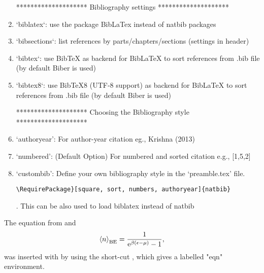 \begin{enumerate}
\begin{center}
******************** Bibliography settings ********************
\end{center}
\item`biblatex`: use the package BibLaTex instead of natbib packages

\item`bibsections`: list references by parts/chapters/sections (settings in header)

\item`bibtex`: use BibTeX as backend for BibLaTeX to sort references from .bib file (by default Biber is used)

\item`bibtex8`: use BibTeX8 (UTF-8 support) as backend for BibLaTeX to sort references from .bib file (by default Biber is used)

\begin{center}
******************** Choosing the Bibliography style ********************
\end{center}
\item`authoryear': For author-year citation eg., Krishna (2013)

\item`numbered': (Default Option) For numbered and sorted citation e.g., [1,5,2]

\item`custombib': Define your own bibliography style in the `preamble.tex' file.
              \begin{verbatim}\RequirePackage}[square, sort, numbers, authoryear]{natbib} \end{verbatim}.
              This can be also used to load biblatex instead of natbib
              
\end{enumerate}



The equation from \autocite{Einstein1924, Einstein1925} and \autocite{deBroglie1929}
\begin{equation}\label{eqn:bose_einstein_distribution}
	\left\langle n \right\rangle_\mathrm{BE}=\frac{1}{\mathrm{e}^{\beta \left( \epsilon - \mu \right) } - 1},
\end{equation}
\tikzexternaldisable %
was inserted with by using the short-cut , which gives a labelled "eqn" environment.
\tikzexternalenable
